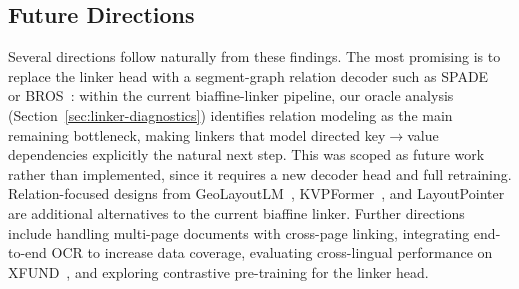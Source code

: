 \subsection{Future Directions}

Several directions follow naturally from these findings. The most promising is
to replace the linker head with a segment-graph relation decoder such as
SPADE~\cite{spade} or BROS~\cite{bros}: within the current biaffine-linker
pipeline, our oracle analysis (Section~\ref{sec:linker-diagnostics}) identifies
relation modeling as the main remaining bottleneck, making linkers that model
directed key$\to$value dependencies explicitly the natural next step. This was
scoped as future work rather than implemented, since it requires
a new decoder head and full retraining. Relation-focused designs from
GeoLayoutLM~\cite{geolayoutlm}, KVPFormer~\cite{kvpformer}, and
LayoutPointer~\cite{layoutpointer} are additional alternatives to the current
biaffine linker. Further directions include handling
multi-page documents with cross-page linking, integrating end-to-end OCR to
increase data coverage, evaluating cross-lingual performance on XFUND~\cite{xfund}, and
exploring contrastive pre-training for the linker head.
